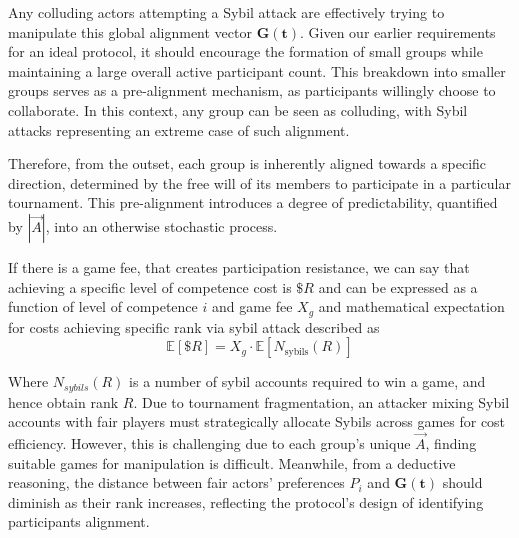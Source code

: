 \documentclass{article}
\begin{document}
\begin{CJK}{UTF8}{gbsn}
\begin{multicols}{2}
        Any colluding actors attempting a Sybil attack are effectively trying to manipulate this global alignment vector $\mathbf{G(t)}$. Given our earlier requirements for an ideal protocol, it should encourage the formation of small groups while maintaining a large overall active participant count. This breakdown into smaller groups serves as a pre-alignment mechanism, as participants willingly choose to collaborate. In this context, any group can be seen as colluding, with Sybil attacks representing an extreme case of such alignment.

        Therefore, from the outset, each group is inherently aligned towards a specific direction, determined by the free will of its members to participate in a particular tournament. This pre-alignment introduces a degree of predictability, quantified by $|\vec{A}|$, into an otherwise stochastic process.


        If there is a game fee, that creates participation resistance, we can say that achieving a specific level of competence cost is $\$R$ and can be expressed as a function of level of competence $i$ and game fee $X_g$ and mathematical expectation for costs achieving specific rank via sybil attack described as
            \begin{equation}
                \mathbb{E}[\$R] = X_g \cdot \mathbb{E}[N_{\text{sybils}}(R)]
            \end{equation}


            Where $N_{sybils}(R)$ is a number of sybil accounts required to win a game, and hence obtain rank $R$. Due to tournament fragmentation, an attacker mixing Sybil accounts with fair players must strategically allocate Sybils across games for cost efficiency. However, this is challenging due to each group's unique $\vec{A}$, finding suitable games for manipulation is difficult.  Meanwhile, from a deductive reasoning, the distance between fair actors' preferences $P_i$ and $\mathbf{G(t)}$ should diminish as their rank increases, reflecting the protocol's design of identifying participants alignment.



\end{multicols}
\end{CJK}
\end{document}
